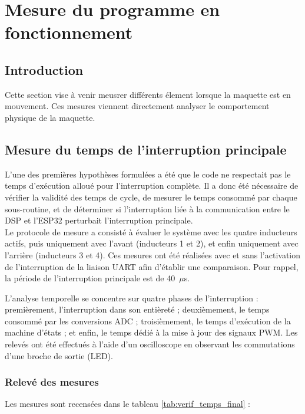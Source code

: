 \chapter{Mesure du programme en fonctionnement}

\section{Introduction}
Cette section vise à venir meusrer différents élement lorsque la maquette est en mouvement. Ces mesures viennent directement analyser le comportement physique de la maquette.

\section{Mesure du temps de l'interruption principale}
L'une des premières hypothèses formulées a été que le code ne respectait pas le temps d'exécution alloué pour l'interruption complète. Il a donc été nécessaire de vérifier la validité des temps de cycle, de mesurer le temps consommé par chaque sous-routine, et de déterminer si l'interruption liée à la communication entre le DSP et l'ESP32 perturbait l'interruption principale.\\

Le protocole de mesure a consisté à évaluer le système avec les quatre inducteurs actifs, puis uniquement avec l'avant (inducteurs 1 et 2), et enfin uniquement avec l'arrière (inducteurs 3 et 4). Ces mesures ont été réalisées avec et sans l'activation de l'interruption de la liaison UART afin d'établir une comparaison. Pour rappel, la période de l'interruption principale est de 40~$\mu$s.

L'analyse temporelle se concentre sur quatre phases de l'interruption : premièrement, l'interruption dans son entièreté ; deuxièmement, le temps consommé par les conversions ADC ; troisièmement, le temps d'exécution de la machine d'états ; et enfin, le temps dédié à la mise à jour des signaux PWM. Les relevés ont été effectués à l'aide d'un oscilloscope en observant les commutations d'une broche de sortie (LED).\\

\subsection{Relevé des mesures}
Les mesures sont recensées dans le tableau \ref{tab:verif_temps_final} :

